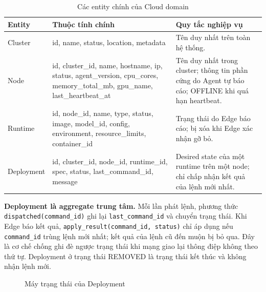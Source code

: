 \begin{table}[H]
\centering
\caption{Các entity chính của Cloud domain}
\label{tab:cloud-entities}
\begin{tabularx}{\textwidth}{L{2.4cm}L{5.2cm}Y}
\toprule
\textbf{Entity} & \textbf{Thuộc tính chính} & \textbf{Quy tắc nghiệp vụ}\\
\midrule
Cluster & id, name, status, location, metadata & Tên duy nhất trên toàn hệ thống.\\
Node & id, cluster\_id, name, hostname, ip, status, agent\_version, cpu\_cores, memory\_total\_mb, gpu\_name, last\_heartbeat\_at & Tên duy nhất trong cluster; thông tin phần cứng do Agent tự báo cáo; OFFLINE khi quá hạn heartbeat.\\
Runtime & id, node\_id, name, type, status, image, model\_id, config, environment, resource\_limits, container\_id & Trạng thái do Edge báo cáo; bị xóa khi Edge xác nhận gỡ bỏ.\\
Deployment & id, cluster\_id, node\_id, runtime\_id, spec, status, last\_command\_id, message & Desired state của một runtime trên một node; chỉ chấp nhận kết quả của lệnh mới nhất.\\
\bottomrule
\end{tabularx}
\end{table}

\textbf{Deployment là aggregate trung tâm.} Mỗi lần phát lệnh, phương thức
\texttt{dispatched(command\_id)} ghi lại \texttt{last\_command\_id} và chuyển trạng
thái. Khi Edge báo kết quả, \texttt{apply\_result(command\_id, status)} chỉ áp dụng
nếu \texttt{command\_id} trùng lệnh mới nhất; kết quả của lệnh cũ đến muộn bị bỏ
qua. Đây là cơ chế chống ghi đè ngược trạng thái khi mạng giao lại thông điệp
không theo thứ tự. Deployment ở trạng thái REMOVED là trạng thái kết thúc và
không nhận lệnh mới.

\begin{figure}[H]
\centering
{}
\caption{Máy trạng thái của Deployment}
\label{fig:deployment-state-machine}
\end{figure}

